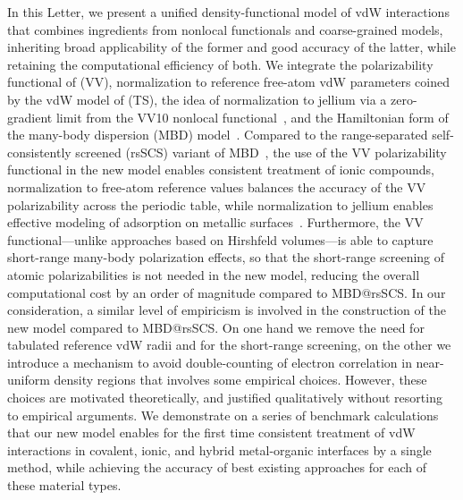In this Letter, we present a unified density-functional model of vdW interactions that combines ingredients from nonlocal functionals and coarse-grained models, inheriting broad applicability of the former and good accuracy of the latter, while retaining the computational efficiency of both.
We integrate the polarizability functional of \citet{VydrovPRA10} (VV), normalization to reference free-atom vdW parameters coined by the vdW model of \citet{TkatchenkoPRL09} (TS), the idea of normalization to jellium via a zero-gradient limit from the VV10 nonlocal functional~\citep{VydrovJCP10a}, and the Hamiltonian form of the many-body dispersion (MBD) model~\citep{TkatchenkoJCP13}.
Compared to the range-separated self-consistently screened (rsSCS) variant of MBD~\citep{AmbrosettiJCP14}, the use of the VV polarizability functional in the new model enables consistent treatment of ionic compounds, normalization to free-atom reference values balances the accuracy of the VV polarizability across the periodic table, while normalization to jellium enables effective modeling of adsorption on metallic surfaces~\citep{RuizPRL12}.
Furthermore, the VV functional---unlike approaches based on Hirshfeld volumes---is able to capture short-range many-body polarization effects, so that the short-range screening of atomic polarizabilities is not needed in the new model, reducing the overall computational cost by an order of magnitude compared to MBD@rsSCS\@.
In our consideration, a similar level of empiricism is involved in the construction of the new model compared to MBD@rsSCS\@.
On one hand we remove the need for tabulated reference vdW radii and for the short-range screening, on the other we introduce a mechanism to avoid double-counting of electron correlation in near-uniform density regions that involves some empirical choices.
However, these choices are motivated theoretically, and justified qualitatively without resorting to empirical arguments.
We demonstrate on a series of benchmark calculations that our new model enables for the first time consistent treatment of vdW interactions in covalent, ionic, and hybrid metal-organic interfaces by a single method, while achieving the accuracy of best existing approaches for each of these material types.



